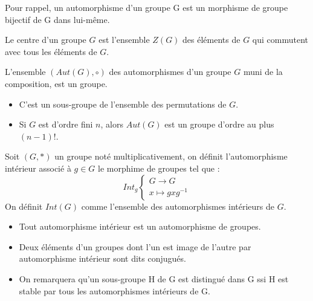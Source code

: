 Pour rappel, un automorphisme d'un groupe G est un morphisme de groupe bijectif de G dans lui-même.

\begin{definition}
    Le centre d'un groupe $G$ est l'ensemble $Z(G)$ des éléments de $G$ qui commutent avec tous les éléments de $G$.
\end{definition}

\begin{theorem}[Automorphismes]
    L'ensemble $(Aut(G),\circ)$ des automorphismes d'un groupe $G$ muni de la composition, est un groupe.
    \begin{itemize}
        \item C'est un sous-groupe de l'ensemble des permutations de $G$. 
        \item Si $G$ est d'ordre fini $n$, alors $Aut(G)$ est un groupe d'ordre au plus $(n-1)!$.
    \end{itemize}
\end{theorem}

\begin{definition}
    Soit $(G,\ast)$ un groupe noté multiplicativement, on définit l'automorphisme intérieur associé à $g \in G$ le morphime
    de groupes tel que :
    \[  Int_g
        \begin{cases}
            G \longrightarrow G \\
            x \longmapsto gxg^{-1}
        \end{cases}
    \]
    On définit $Int(G)$ comme l'ensemble des automorphismes intérieurs de $G$.
\end{definition}

\begin{remark}
    \begin{itemize}
        \item Tout automorphisme intérieur est un automorphisme de groupes. 
        \item Deux éléments d'un groupes dont l'un est image de l'autre par automorphisme intérieur sont dits conjugués. 
        \item On remarquera qu'un sous-groupe H de G est distingué dans G ssi H est stable par tous les automorphismes intérieurs de G. 
    \end{itemize}
\end{remark}
